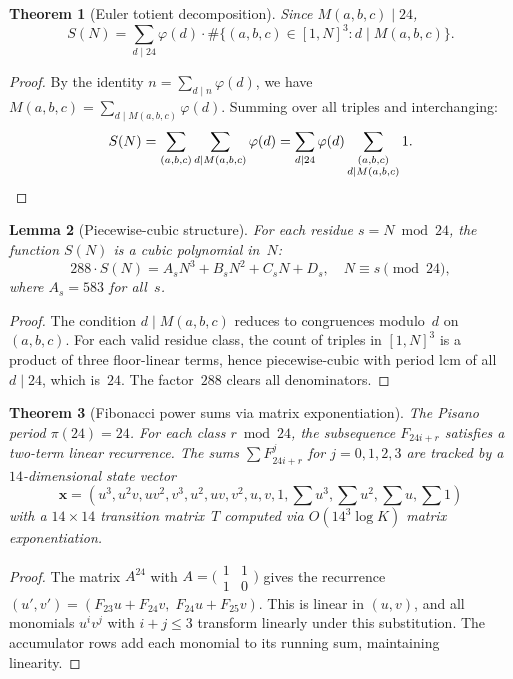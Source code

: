 \documentclass[11pt]{article}
\newtheorem{theorem}{Theorem}
\newtheorem{lemma}[theorem]{Lemma}
\begin{document}
\begin{theorem}[Euler totient decomposition]
Since $M(a,b,c) \mid 24$,
\[
S(N) = \sum_{d \mid 24} \varphi(d) \cdot \#\{(a,b,c) \in [1,N]^3 : d \mid M(a,b,c)\}.
\]
\end{theorem}

\begin{proof}
By the identity $n = \sum_{d \mid n}\varphi(d)$, we have $M(a,b,c) = \sum_{d \mid M(a,b,c)}\varphi(d)$.  Summing over all triples and interchanging:
\[
S(N) = \sum_{(a,b,c)}\sum_{d \mid M(a,b,c)}\varphi(d) = \sum_{d \mid 24}\varphi(d)\sum_{\substack{(a,b,c)\\d \mid M(a,b,c)}} 1. \qedhere
\]
\end{proof}

\begin{lemma}[Piecewise-cubic structure]
For each residue $s = N \bmod 24$, the function $S(N)$ is a cubic polynomial in~$N$:
\[
288 \cdot S(N) = A_s N^3 + B_s N^2 + C_s N + D_s, \quad N \equiv s \pmod{24},
\]
where $A_s = 583$ for all~$s$.
\end{lemma}

\begin{proof}
The condition $d \mid M(a,b,c)$ reduces to congruences modulo~$d$ on $(a,b,c)$.  For each valid residue class, the count of triples in $[1,N]^3$ is a product of three floor-linear terms, hence piecewise-cubic with period $\mathrm{lcm}$ of all $d \mid 24$, which is~$24$.  The factor~$288$ clears all denominators.
\end{proof}

\begin{theorem}[Fibonacci power sums via matrix exponentiation]
The Pisano period $\pi(24) = 24$.  For each class $r \bmod 24$, the subsequence $F_{24i+r}$ satisfies a two-term linear recurrence.  The sums $\sum F_{24i+r}^j$ for $j=0,1,2,3$ are tracked by a $14$-dimensional state vector
\[
\mathbf{x} = (u^3, u^2v, uv^2, v^3, u^2, uv, v^2, u, v, 1, \textstyle\sum u^3, \sum u^2, \sum u, \sum 1)
\]
with a $14\times 14$ transition matrix~$T$ computed via $O(14^3 \log K)$ matrix exponentiation.
\end{theorem}

\begin{proof}
The matrix $A^{24}$ with $A = \bigl(\begin{smallmatrix}1&1\\1&0\end{smallmatrix}\bigr)$ gives the recurrence $(u',v') = (F_{23}u + F_{24}v,\; F_{24}u + F_{25}v)$.  This is linear in $(u,v)$, and all monomials $u^i v^j$ with $i+j \le 3$ transform linearly under this substitution.  The accumulator rows add each monomial to its running sum, maintaining linearity.
\end{proof}
\end{document}
